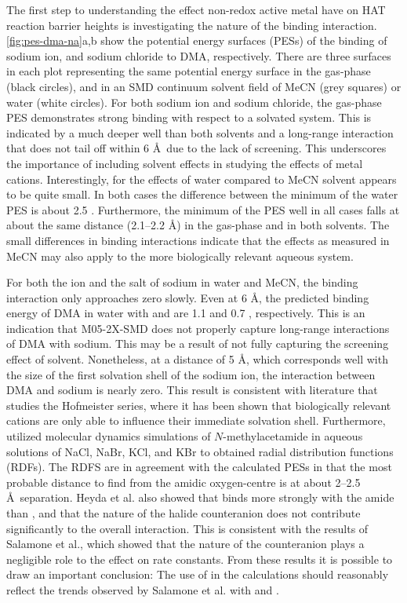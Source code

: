 \begin{doublespace}
The first step to understanding the effect non-redox active metal have on HAT
reaction barrier heights is investigating the nature of the binding interaction.
\ref{fig:pes-dma-na}a,b show the potential energy surfaces (PESs) of the binding
of sodium ion, and sodium chloride to DMA, respectively. There are three
surfaces in each plot representing the same potential energy surface in the
gas-phase (black circles), and in an SMD\cite{Marenich2009} continuum solvent
field of MeCN (grey squares) or water (white circles). For both sodium ion and
sodium chloride, the gas-phase PES demonstrates strong binding with respect to a
solvated system. This is indicated by a much deeper well than both solvents and
a long-range interaction that does not tail off within 6 \AA\ due to the lack of
screening. This underscores the importance of including solvent effects in
studying the effects of metal cations. Interestingly, for the effects of water
compared to MeCN solvent appears to be quite small. In both cases the difference
between the minimum of the water PES is about 2.5 \kcalmol. Furthermore, the
minimum of the PES well in all cases falls at about the same distance (2.1--2.2
\AA) in the gas-phase and in both solvents. The small differences in binding
interactions indicate that the effects as measured in MeCN may also apply to the
more biologically relevant aqueous system.

For both the ion and the salt of sodium in water and MeCN, the binding
interaction only approaches zero slowly. Even at 6 \AA, the predicted binding
energy of DMA in water with  and  are 1.1 and 0.7 \kcalmol,
respectively. This is an indication that M05-2X-SMD does not properly capture
long-range interactions of DMA with sodium. This may be a result of not fully
capturing the screening effect of solvent. Nonetheless, at a distance of 5 \AA,
which corresponds well with the size of the first solvation shell of the sodium
ion,\cite{Degreve1996} the interaction between DMA and sodium is nearly zero.
This result is consistent with literature that studies the Hofmeister series,
where it has been shown that biologically relevant cations are only able to
influence their immediate solvation shell.\cite{Omta2003, Funkner2011}
Furthermore, \citet{Heyda2009} utilized molecular dynamics simulations of
$N$-methylacetamide in aqueous solutions of NaCl, NaBr, KCl, and KBr to obtained
radial distribution functions (RDFs). The RDFS are in agreement with the
calculated PESs in that the most probable distance to find  from the
amidic oxygen-centre is at about 2--2.5 \AA\ separation. Heyda et al. also
showed that  binds more strongly with the amide than , and that
the nature of the halide counteranion does not contribute significantly to the
overall interaction. This is consistent with the results of Salamone et al.,
which showed that the nature of the counteranion plays a negligible role to the
effect on rate constants.\cite{Salamone2013a} From these results it is possible
to draw an important conclusion: The use of  in the calculations should
reasonably reflect the trends observed by Salamone et al.  with  and
.


\end{doublespace}
